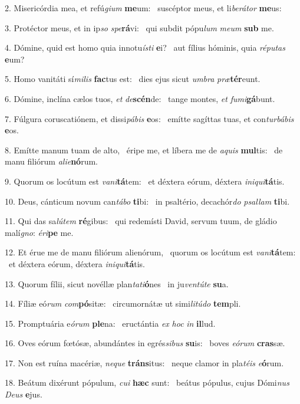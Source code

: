 2. Misericórdia mea, et refú\textit{gi}\textit{um} \textbf{me}um: \ast\  suscéptor meus, et li\textit{be}\textit{rá}\textit{tor} \textbf{me}us:\

3. Protéctor meus, et in ip\textit{so} \textit{spe}\textbf{rá}vi: \ast\  qui subdit pópu\textit{lum} \textit{me}\textit{um} \textbf{sub} me.\

4. Dómine, quid est homo quia innotu\textit{ís}\textit{ti} \textbf{e}i? \ast\  aut fílius hóminis, quia \textit{ré}\textit{pu}\textit{tas} \textbf{e}um?\

5. Homo vanitáti sí\textit{mi}\textit{lis} \textbf{fac}tus est: \ast\  dies ejus sicut \textit{um}\textit{bra} \textit{præ}\textbf{tér}eunt.\

6. Dómine, inclína cælos tuos, \textit{et} \textit{de}\textbf{scén}de: \ast\  tange montes, \textit{et} \textit{fu}\textit{mi}\textbf{gá}bunt.\

7. Fúlgura coruscatiónem, et dissi\textit{pá}\textit{bis} \textbf{e}os: \ast\  emítte sagíttas tuas, et con\textit{tur}\textit{bá}\textit{bis} \textbf{e}os.\

8. Emítte manum tuam de alto, \dag\  éripe me, et líbera me de \textit{a}\textit{quis} \textbf{mul}tis: \ast\  de manu filiórum \textit{a}\textit{li}\textit{e}\textbf{nó}rum.\

9. Quorum os locútum est \textit{va}\textit{ni}\textbf{tá}tem: \ast\  et déxtera eórum, déxtera \textit{in}\textit{i}\textit{qui}\textbf{tá}tis.\

10. Deus, cánticum novum can\textit{tá}\textit{bo} \textbf{ti}bi: \ast\  in psaltério, decachór\textit{do} \textit{psal}\textit{lam} \textbf{ti}bi.\

11. Qui das sa\textit{lú}\textit{tem} \textbf{ré}gibus: \ast\  qui redemísti David, servum tuum, de gládio malí\textit{gno}: \textit{é}\textit{ri}\textbf{pe} me.\

12. Et érue me de manu filiórum alienórum, \dag\  quorum os locútum est \textit{va}\textit{ni}\textbf{tá}tem: \ast\  et déxtera eórum, déxtera \textit{in}\textit{i}\textit{qui}\textbf{tá}tis.\

13. Quorum fílii, sicut novéllæ plan\textit{ta}\textit{ti}\textbf{ó}nes \ast\  in ju\textit{ven}\textit{tú}\textit{te} \textbf{su}a.\

14. Fíliæ eó\textit{rum} \textit{com}\textbf{pó}sitæ: \ast\  circumornátæ ut simi\textit{li}\textit{tú}\textit{do} \textbf{tem}pli.\

15. Promptuária e\textit{ó}\textit{rum} \textbf{ple}na: \ast\  eructántia \textit{ex} \textit{hoc} \textit{in} \textbf{il}lud.\

16. Oves eórum fœtósæ, abundántes in egrés\textit{si}\textit{bus} \textbf{su}is: \ast\  boves \textit{e}\textit{ó}\textit{rum} \textbf{cras}sæ.\

17. Non est ruína macériæ, \textit{ne}\textit{que} \textbf{tráns}itus: \ast\  neque clamor in pla\textit{té}\textit{is} \textit{e}\textbf{ó}rum.\

18. Beátum dixérunt pópulum, \textit{cu}\textit{i} \textbf{hæc} sunt: \ast\  beátus pópulus, cujus Dómi\textit{nus} \textit{De}\textit{us} \textbf{e}jus.\

